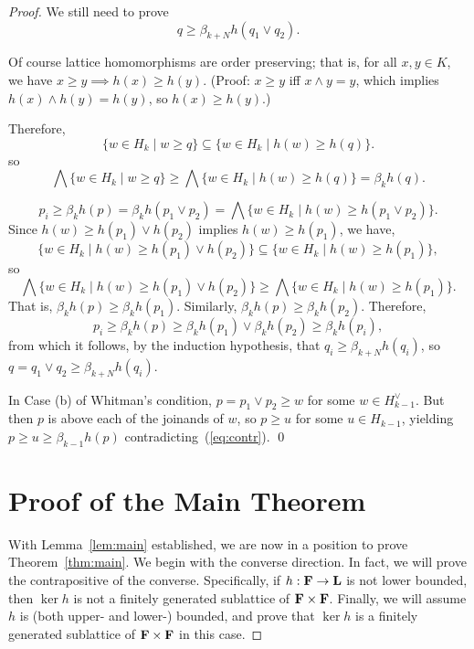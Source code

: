 \begin{proof}
We still need to prove 
\[
q \geq \beta_{k+N}h(q_1 \vee q_2).
\]

\bigskip
Of course lattice homomorphisms are order preserving; 
that is, for all $x, y \in K$, we have $x \geq y  \implies h(x) \geq h(y)$.
(Proof: $x\geq y$ iff $x \wedge y = y$, which implies 
$h(x) \wedge h(y) = h(y)$, so $h(x) \geq h(y)$.)

Therefore, 
\[
\{w \in H_{k} \mid w \geq q\} \subseteq 
\{w \in H_{k} \mid h(w) \geq h(q)\}.
\]
so
\[
\bigwedge \{w \in H_{k} \mid w \geq q\} \geq
\bigwedge \{w \in H_{k} \mid h(w) \geq h(q)\} = \beta_k h(q).
\]


\bigskip


\[
p_i \geq \beta_{k}h(p)  = \beta_{k}h(p_1 \vee p_2)
= \bigwedge \{w \in H_{k} \mid h(w) \geq h(p_1 \vee p_2)\}.
\] 
Since $h(w) \geq h(p_1) \vee h(p_2)$ implies $h(w) \geq h(p_1)$, we have,
\[
\{w \in H_{k} \mid h(w) \geq h(p_1) \vee h(p_2)\}
\subseteq \{w \in H_{k} \mid h(w) \geq h(p_1)\},
\] 
so 
\[
\bigwedge \{w \in H_{k} \mid h(w) \geq h(p_1) \vee h(p_2)\}
\geq \bigwedge \{w \in H_{k} \mid h(w) \geq h(p_1)\}.
\]
That is, $\beta_{k}h(p) \geq \beta_{k}h(p_1)$.
Similarly, $\beta_{k}h(p) \geq \beta_{k}h(p_2)$. Therefore, 
\[
p_i \geq \beta_{k}h(p)  \geq \beta_{k}h(p_1) \vee \beta_{k}h(p_2)
\geq \beta_{k}h(p_i),
\]
from which it follows, by the induction hypothesis, that 
$q_i \geq \beta_{k+N}h(q_i)$, so 
$q = q_1 \vee q_2 \geq \beta_{k+N}h(q_i)$.



In Case (b) of Whitman's condition,
$p = p_1 \vee p_2 \geq w$ for some $w \in H_{k-1}^{\vee}$.  But then $p$ is above each 
of the joinands of $w$, so $p \geq u$ for some  $u \in H_{k-1}$, yielding 
$p \geq u \geq \beta_{k-1}h(p)$ contradicting~(\ref{eq:contr}).
\qed


\section{Proof of the Main Theorem}
With Lemma~\ref{lem:main} established, we are now in a position to prove 
Theorem~\ref{thm:main}.  We begin with the converse direction.  
In fact, we will prove the contrapositive of the converse.
Specifically, if $h: \mathbf{F} \to \mathbf{L}$ is not lower bounded,
then $\ker h$ is not a finitely generated sublattice of 
$\mathbf{F} \times \mathbf{F}$.  Finally,  we will assume $h$ is 
(both upper- and lower-) bounded, and prove that $\ker h$ is a 
finitely generated sublattice of $\mathbf{F} \times \mathbf{F}$ in this case. 

\medskip


\end{proof}
